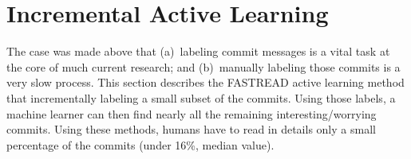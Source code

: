 \documentclass[10pt,journal,compsoc]{IEEEtran}
\begin{document}


  

\section{ Incremental Active Learning}

  The case was made above that (a)~labeling commit messages is a vital task at the core of much current research; and (b)~manually labeling those commits is a very slow process. This
section describes the FASTREAD  active learning method
that incrementally labeling a small subset of the commits. Using those labels, a machine learner can then find nearly all the  remaining interesting/worrying commits. Using these methods, humans have to read in details only a small percentage of the commits (under 16\%, median value).  
 
\end{document}
